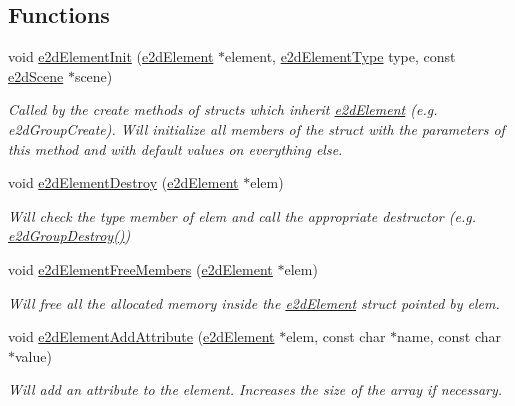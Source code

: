 \subsection*{Functions}
\begin{DoxyCompactItemize}
\item 
void \hyperlink{group__e2dElement_ga8734d10ef40a380dfc51bfe1790a92a7}{e2d\-Element\-Init} (\hyperlink{structe2dElement}{e2d\-Element} $\ast$element, \hyperlink{group__e2dElement_ga9bc8cfdec08c7e9069fc707ee456fd38}{e2d\-Element\-Type} type, const \hyperlink{structe2dScene}{e2d\-Scene} $\ast$scene)
\begin{DoxyCompactList}\small\item\em Called by the create methods of structs which inherit \hyperlink{structe2dElement}{e2d\-Element} (e.\-g. e2d\-Group\-Create). Will initialize all members of the struct with the parameters of this method and with default values on everything else. \end{DoxyCompactList}\item 
void \hyperlink{group__e2dElement_ga214c437a16fe6f3fc795539f851a2019}{e2d\-Element\-Destroy} (\hyperlink{structe2dElement}{e2d\-Element} $\ast$elem)
\begin{DoxyCompactList}\small\item\em Will check the type member of elem and call the appropriate destructor (e.\-g. \hyperlink{group__e2dGroup_ga545626effa0f89b72f244e56aadb05bc}{e2d\-Group\-Destroy()}) \end{DoxyCompactList}\item 
void \hyperlink{group__e2dElement_gae8da5104d70a09549ca74044dda8313c}{e2d\-Element\-Free\-Members} (\hyperlink{structe2dElement}{e2d\-Element} $\ast$elem)
\begin{DoxyCompactList}\small\item\em Will free all the allocated memory inside the \hyperlink{structe2dElement}{e2d\-Element} struct pointed by elem. \end{DoxyCompactList}\item 
void \hyperlink{group__e2dElement_ga5cfa0a343d3dd1a30b0addc4ec6e7f88}{e2d\-Element\-Add\-Attribute} (\hyperlink{structe2dElement}{e2d\-Element} $\ast$elem, const char $\ast$name, const char $\ast$value)
\begin{DoxyCompactList}\small\item\em Will add an attribute to the element. Increases the size of the array if necessary. \end{DoxyCompactList}\item 

\end{DoxyCompactItemize}
